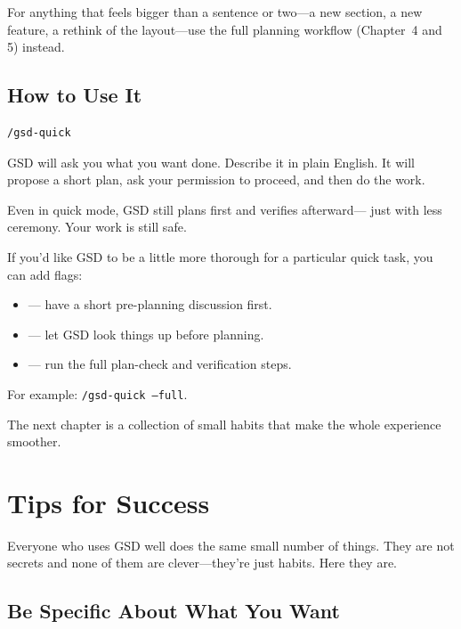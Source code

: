 \documentclass[11pt,letterpaper,openany]{book}
\begin{document}
For anything that feels bigger than a sentence or two---a new
section, a new feature, a rethink of the layout---use the full
planning workflow (Chapter~4 and 5) instead.

\section{How to Use It}

\begin{lstlisting}
/gsd-quick
\end{lstlisting}

GSD will ask you what you want done. Describe it in plain English.
It will propose a short plan, ask your permission to proceed, and
then do the work.

\begin{gsdtip}
Even in quick mode, GSD still plans first and verifies afterward---
just with less ceremony. Your work is still safe.
\end{gsdtip}

If you'd like GSD to be a little more thorough for a particular
quick task, you can add flags:

\begin{itemize}
  \item {} --- have a short pre-planning discussion
        first.
  \item {} --- let GSD look things up before planning.
  \item {} --- run the full plan-check and verification
        steps.
\end{itemize}

For example: \texttt{/gsd-quick --full}.

\bigskip
\noindent The next chapter is a collection of small habits that make
the whole experience smoother.

\chapter{Tips for Success}

Everyone who uses GSD well does the same small number of things.
They are not secrets and none of them are clever---they're just
habits. Here they are.

\section{Be Specific About What You Want}
\end{document}
